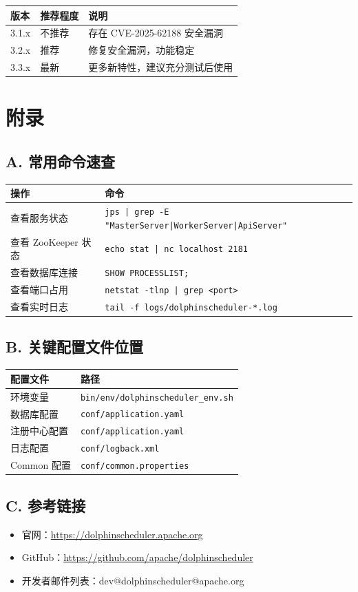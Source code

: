 \documentclass[UTF8, a4paper]{ctexbook}
\begin{document}
\begin{longtable}{p{3cm}p{3cm}p{6cm}}
	\toprule
	\textbf{版本} & \textbf{推荐程度} & \textbf{说明} \\
	\midrule
	3.1.x & 不推荐 & 存在 CVE-2025-62188 安全漏洞 \\
	3.2.x & 推荐   & 修复安全漏洞，功能稳定 \\
	3.3.x & 最新   & 更多新特性，建议充分测试后使用 \\
	\bottomrule
\end{longtable}
	
\chapter{附录}
	
\section*{A. 常用命令速查}

\begin{longtable}{p{5cm}p{7cm}}
	\toprule
	\textbf{操作} & \textbf{命令} \\
	\midrule
	查看服务状态 & \texttt{jps | grep -E "MasterServer|WorkerServer|ApiServer"} \\
	查看 ZooKeeper 状态 & \texttt{echo stat | nc localhost 2181} \\
	查看数据库连接 & \texttt{SHOW PROCESSLIST;} \\
	查看端口占用 & \texttt{netstat -tlnp | grep <port>} \\
	查看实时日志 & \texttt{tail -f logs/dolphinscheduler-*.log} \\
	\bottomrule
\end{longtable}
	
\section*{B. 关键配置文件位置}

\begin{longtable}{p{5cm}p{7cm}}
	\toprule
	\textbf{配置文件} & \textbf{路径} \\
	\midrule
	环境变量 & \texttt{bin/env/dolphinscheduler\_env.sh} \\
	数据库配置 & \texttt{conf/application.yaml} \\
	注册中心配置 & \texttt{conf/application.yaml} \\
	日志配置 & \texttt{conf/logback.xml} \\
	Common 配置 & \texttt{conf/common.properties} \\
	\bottomrule
\end{longtable}
	
\section*{C. 参考链接}

\begin{itemize}
	\item 官网：\url{https://dolphinscheduler.apache.org}
	\item GitHub：\url{https://github.com/apache/dolphinscheduler}
	\item 开发者邮件列表：dev@dolphinscheduler@apache.org
\end{itemize}
	
\end{document}
